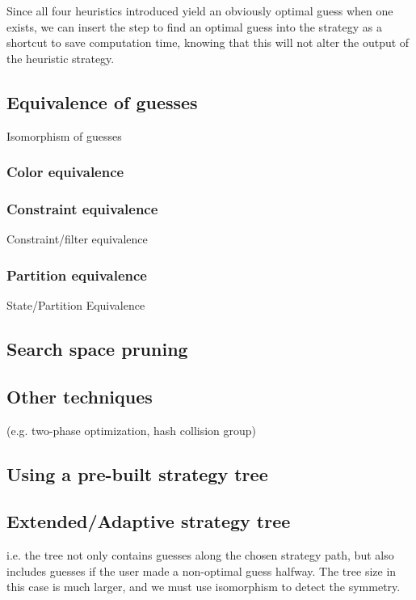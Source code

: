 Since all four heuristics introduced yield an obviously optimal guess when one exists, we can insert the step to find an optimal guess into the strategy as a shortcut to save computation time, knowing that this will not alter the output of the heuristic strategy.

\subsection{Equivalence of guesses}

Isomorphism of guesses

\subsubsection{Color equivalence}

\subsubsection{Constraint equivalence}

Constraint/filter equivalence

\subsubsection{Partition equivalence}

State/Partition Equivalence

\subsection{Search space pruning}

\subsection{Other techniques}

(e.g. two-phase optimization, hash collision group)

\subsection{Using a pre-built strategy tree}

\subsection{Extended/Adaptive strategy tree}

i.e. the tree not only contains guesses along the chosen strategy path, but also includes guesses if the user made a non-optimal guess halfway. The tree size in this case is much larger, and we must use isomorphism to detect the symmetry.

 
